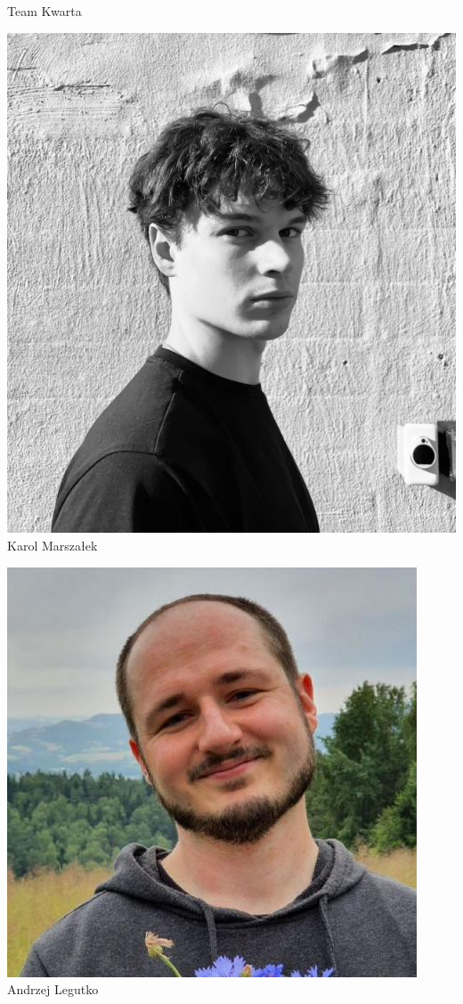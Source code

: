 \begin{frame}[t]{Team Kwarta}
\begin{minipage}{0.22\linewidth}
\centering
\includegraphics[width=\linewidth]{img/KM}\\
\scriptsize Karol Marszałek \\
\scriptsize {}
\end{minipage}\pause
\hspace{2em}
\begin{minipage}{0.22\linewidth}
\centering
\includegraphics[width=\linewidth]{img/AL}\\
\scriptsize Andrzej Legutko \\
\scriptsize {}
\end{minipage}
\end{frame}
